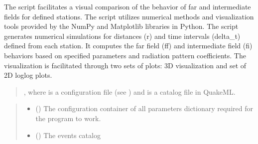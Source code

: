 \documentclass[letterpaper,10pt,english]{sphinxmanual}
\begin{document}
\sphinxAtStartPar
The script facilitates a visual comparison of the behavior of far and intermediate fields for defined stations.
The script utilizes numerical methods and visualization tools provided by the NumPy and Matplotlib
libraries in Python. The script generates numerical simulations for distances (r) and time intervals
(delta\_t) defined from each station.
It computes the far field (ff) and intermediate field (fi) behaviors based on specified parameters
and radiation pattern coefficients.
The visualization is facilitated through two sets of plots: 3D visualization
and set of 2D log\sphinxhyphen{}log plots.
\begin{quote}\begin{description}
\sphinxAtStartPar
{}, where  is a configuration file
(see {\hyperref[\detokenize{configuration:configuration}]{}}) and  is a catalog file in QuakeML.

\end{description}\end{quote}

\begin{fulllineitems}
\label{\detokenize{api_run:ssscat.fields_on_station}}
\pysigstartsignatures
{}
\pysigstopsignatures
\sphinxAtStartPar
{}
\begin{quote}\begin{description}
\begin{itemize}
\item {} 
\sphinxAtStartPar
{} () \textendash{} The configuration container of all parameters dictionary required for the program to work.

\item {} 
\sphinxAtStartPar
{} () \textendash{} The events catalog

\end{itemize}

\end{description}\end{quote}

\end{fulllineitems}
\end{document}
